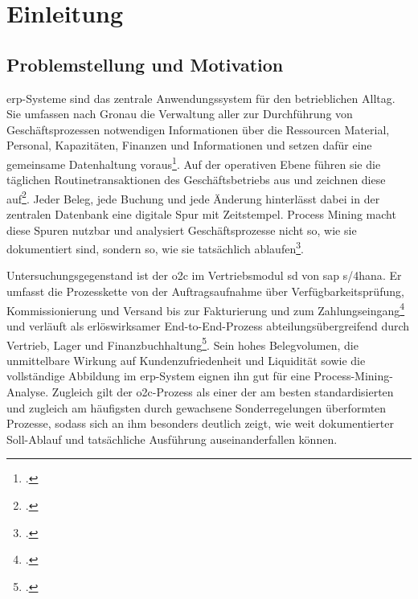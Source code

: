 \chapter{Einleitung}\label{ch:einleitung}


\section{Problemstellung und Motivation}\label{sec:problemstellung}

\gls{erp}-Systeme sind das zentrale Anwendungssystem für den betrieblichen Alltag. Sie umfassen nach Gronau die Verwaltung aller zur Durchführung von Geschäftsprozessen notwendigen Informationen über die Ressourcen Material, Personal, Kapazitäten, Finanzen und Informationen und setzen dafür eine gemeinsame Datenhaltung voraus\footcite[Vgl.][S.~4]{gronau2014erp}. Auf der operativen Ebene führen sie die täglichen Routinetransaktionen des Geschäftsbetriebs aus und zeichnen diese auf\footcite[Vgl.][S.~125 ff.]{vanderaalst2016processmining}. Jeder Beleg, jede Buchung und jede Änderung hinterlässt dabei in der zentralen Datenbank eine digitale Spur mit Zeitstempel. Process Mining macht diese Spuren nutzbar und analysiert Geschäftsprozesse nicht so, wie sie dokumentiert sind, sondern so, wie sie tatsächlich ablaufen\footcites(Vgl.)()[S.~169 f.]{vanderaalst2012manifesto}[S.~13]{adolfsson2026o2c}.

Untersuchungsgegenstand ist der \gls{o2c} im Vertriebsmodul \gls{sd} von \gls{sap} \gls{s/4hana}. Er umfasst die Prozesskette von der Auftragsaufnahme über Verfügbarkeitsprüfung, Kommissionierung und Versand bis zur Fakturierung und zum Zahlungseingang\footcite[Vgl.][]{SAP_Verkaufsanalyse} und verläuft als erlöswirksamer End-to-End-Prozess abteilungsübergreifend durch Vertrieb, Lager und Finanzbuchhaltung\footcite[Vgl.][S.~63 ff.]{scheibler2021vertrieb}. Sein hohes Belegvolumen, die unmittelbare Wirkung auf Kundenzufriedenheit und Liquidität sowie die vollständige Abbildung im \gls{erp}-System eignen ihn gut für eine Process-Mining-Analyse. Zugleich gilt der \gls{o2c}-Prozess als einer der am besten standardisierten und zugleich am häufigsten durch gewachsene Sonderregelungen überformten Prozesse, sodass sich an ihm besonders deutlich zeigt, wie weit dokumentierter Soll-Ablauf und tatsächliche Ausführung auseinanderfallen können.

